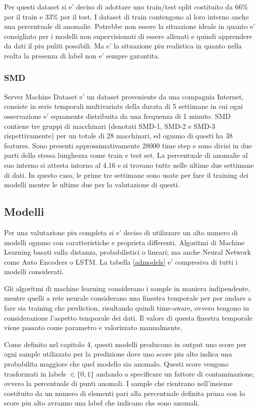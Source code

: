 Per questi dataset si e' deciso di adottare uno train/test split costituito da 66\% per il train e 33\% per il test. I dataset di train contengono al loro interno anche una percentuale di anomalie. Potrebbe non essere la situazione ideale in quanto e' consigliato per i modelli non supervisionati di essere allenati e quindi apprendere da dati il piu puliti possibili. Ma e' la situazione piu realistica in quanto nella realta la presenza di label non e' sempre garantita.  

\subsubsection{SMD}
Server Machine Dataset e' un dataset proveniente da una compagnia Internet, consiste in serie temporali multivariate della durata di 5 settimane in cui ogni osservazione e' equamente distribuita da una frequenza di 1 minuto. SMD contiene tre gruppi di macchinari (denotati SMD-1, SMD-2 e SMD-3 rispettivamente) per un totale di 28 macchinari, ed ognuno di questi ha 38 features. Sono presenti approssimativamente 28000 time step e sono divisi in due parti della stessa lunghezza come train e test set. 
La percentuale di anomalie al suo interno si attesta intorno al 4.16 e si trovano tutte nelle ultime due settimane di dati. In questo caso, le prime tre settimane sono usate per fare il training dei modelli mentre le ultime due per la valutazione di questi.



\subsection{Modelli}
Per una valutazione piu completa si e' deciso di utilizzare un alto numero di modelli ognuno con caratteristiche e proprieta differenti. Algoritmi di Machine Learning basati sulla distanza, probabilistici o lineari; ma anche Neural Network come Auto Encoders o LSTM. La tabella \ref{admodels} e' compresiva di tutti i modelli considerati.

Gli algoritmi di machine learning considerano i sample in maniera indipendente, mentre quelli a rete neurale considerano una finestra temporale per per andare a fare sia training che prediction, risultando quindi time-aware, ovvero tengono in considerazione l'aspetto temporale dei dati. Il valore di questa finestra temporale viene passato come parametro e valorizzato manualmente.

Come definito nel capitolo 4, questi modelli producono in output uno score per ogni sample utilizzato per la predizione dove uno score piu alto indica una probabilita maggiore che quel modello sia anomalo. Questi score vengono trasformati in labels \(\in \{0,1\}\) andando a specificare un fattore di contaminazione, ovvero la percentuale di punti anomali. I sample che rientrano nell'insieme costituito da un numero di elementi pari alla percentuale definita prima con lo score piu alto avranno una label che indicano che sono anomali.

